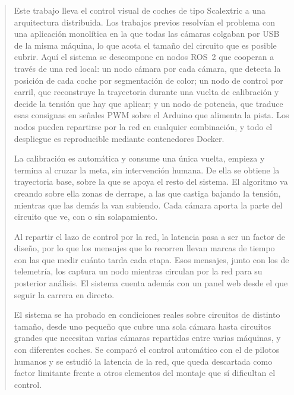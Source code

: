 
\pagestyle{empty}
\begin{abstract}
  Este trabajo lleva el control visual de coches de tipo Scalextric a una arquitectura
  distribuida. Los trabajos previos resolvían el problema con una aplicación monolítica en la
  que todas las cámaras colgaban por USB de la misma máquina, lo que acota el tamaño del
  circuito que es posible cubrir. Aquí el sistema se descompone en nodos ROS~2 que cooperan a
  través de una red local: un nodo cámara por cada cámara, que detecta la posición de cada
  coche por segmentación de color; un nodo de control por carril, que reconstruye la
  trayectoria durante una vuelta de calibración y decide la tensión que hay que aplicar; y un
  nodo de potencia, que traduce esas consignas en señales PWM sobre el Arduino que alimenta la
  pista. Los nodos pueden repartirse por la red en cualquier combinación, y todo el despliegue
  es reproducible mediante contenedores Docker.

  La calibración es automática y consume una única vuelta, empieza y termina al cruzar la
  meta, sin intervención humana. De ella se obtiene la trayectoria base, sobre la que se apoya
  el resto del sistema. El algoritmo va creando sobre ella zonas de derrape, a las que castiga
  bajando la tensión, mientras que las demás la van subiendo. Cada cámara aporta la parte del
  circuito que ve, con o sin solapamiento.

  Al repartir el lazo de control por la red, la latencia pasa a ser un factor de diseño, por lo
  que los mensajes que lo recorren llevan marcas de tiempo con las que medir cuánto tarda cada
  etapa. Esos mensajes, junto con los de telemetría, los captura un nodo mientras circulan por
  la red para su posterior análisis. El sistema cuenta además con un panel web desde el que
  seguir la carrera en directo.

  El sistema se ha probado en condiciones reales sobre circuitos de distinto tamaño, desde uno
  pequeño que cubre una sola cámara hasta circuitos grandes que necesitan varias cámaras
  repartidas entre varias máquinas, y con diferentes coches. Se comparó el control automático
  con el de pilotos humanos y se estudió la latencia de la red, que queda descartada como
  factor limitante frente a otros elementos del montaje que sí dificultan el control.


\end{abstract}
